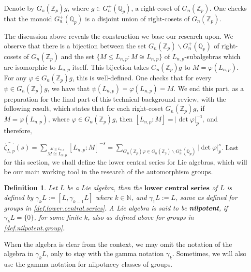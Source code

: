 \documentclass[12pt]{article}
\newtheorem{definition}[theorem]{Definition}
\begin{document}
Denote by $G_n(\mathbb{Z}_p)g$, where $g\in G^+_n(\mathbb{Q}_p)$, a right-coset of $G_n(\mathbb{Z}_p)$. One checks that the monoid $G^+_n(\mathbb{Q}_p)$ is a disjoint union of right-cosets of $G_n(\mathbb{Z}_p)$.\par
The discussion above reveals the construction we base our research upon.
We observe that there is a bijection between the set $G_n(\mathbb{Z}_p)\backslash G^+_n(\mathbb{Q}_p)$ of right-cosets of $G_n(\mathbb{Z}_p)$ and the set $\{M\leq L_{n,p} : M\cong L_{n,p}\}$ of $L_{n,p}$-subalgebras which are isomorphic to $L_{n,p}$ itself. This bijection takes $G_n(\mathbb{Z}_p)g$ to $M=\varphi(L_{n,p})$. For any $\varphi\in G_n(\mathbb{Z}_p)g$, this is well-defined. One checks that for every $\psi\in G_n(\mathbb{Z}_p)g$, we have that $\psi(L_{n,p})=\varphi(L_{n,p})=M$.
We end this part, as a preparation for the final part of this technical background review, with the following result, which states that for each right-coset $G_n(\mathbb{Z}_p)g$, if $M=\varphi(L_{n,p})$, where $\varphi\in G_n(\mathbb{Z}_p)g$, then $[L_{n,p}:M]=|\det\varphi|_p^{-1}$, and therefore,\par $\hat{\zeta_{L,p}}(s)=\underset{\overset{\scriptscriptstyle M\leq L_{n,p}}{\scriptscriptstyle M\cong L_{n,p}}}{\sum}[L_{n,p}:M]^{-s}=\underset{\scriptscriptstyle G_n(\mathbb{Z}_p)\varphi\in G_n(\mathbb{Z}_p)\backslash G^+_n(\mathbb{Q}_p)}{\sum}|\det\varphi|_p^s$.
Last for this section, we shall define the lower central series for Lie algebras, which will be our main working tool in the research of the automorphism groups.
\begin{definition}
Let $L$ be a Lie algebra, then the $\textbf{lower central series}$ of $L$ is defined by $\gamma_k L:=[L,\gamma_{k-1}L]$ where $k\in\mathbb{N}$, and $\gamma_1 L:=L$, same as defined for groups in \ref{def.lower.central.series}. A Lie algebra is said to be \textbf{nilpotent}, if $\gamma_k L=\{0\}$, for some finite $k$, also as defined above for groups in \ref{def.nilpotent.group}.
\end{definition}
When the algebra is clear from the context, we may omit the notation of the algebra in $\gamma_k L$, only to stay with the gamma notation $\gamma_k$. Sometimes, we will also use the gamma notation for nilpotnecy classes of groups.
\end{document}
